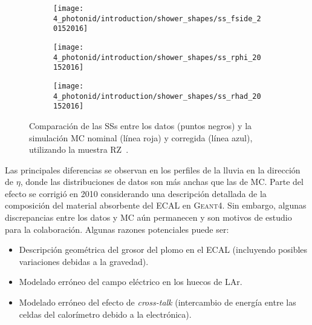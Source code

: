 \begin{figure}[ht!]
    \centering
    \begin{subfigure}[h]{0.32\linewidth}
        \centering
        \texttt{[image: 4\_photonid/introduction/shower\_shapes/ss\_fside\_20152016]}
        \caption{\fside}
        \label{fig:pid_ss:ss_differences:ss:fside}
    \end{subfigure}
    \hfill
    \begin{subfigure}[h]{0.32\linewidth}
        \centering
        \texttt{[image: 4\_photonid/introduction/shower\_shapes/ss\_rphi\_20152016]}
        \caption{\rphi}
        \label{fig:pid_ss:ss_differences:ss:rphi}
    \end{subfigure}
    \hfill
    \begin{subfigure}[h]{0.32\linewidth}
        \centering
        \texttt{[image: 4\_photonid/introduction/shower\_shapes/ss\_rhad\_20152016]}
        \caption{\rhad}
        \label{fig:pid_ss:ss_differences:ss:rhad}
    \end{subfigure}
    \caption{Comparaci\'on de las \acp{SS} entre los datos (puntos negros) y la simulación \ac{MC} nominal (línea roja) y corregida (línea azul), utilizando la muestra \ac{RZ}~\cite{ATLAS-EGamma-Calibration-2015-2016}.}
    \label{fig:pid_ss:ss_differences:ss}
\end{figure}

Las principales diferencias se observan en los perfiles de la lluvia en la direcci\'on de \(\eta\), donde las distribuciones de datos son m\'as anchas que las de \ac{MC}. Parte del efecto se corrigió en 2010 considerando una descripci\'on detallada de la composición del material absorbente del \ac{ECAL} en \textsc{Geant4}. Sin embargo, algunas discrepancias entre los datos y \ac{MC} aún permanecen y son motivos de estudio para la colaboraci\'on. Algunas razones potenciales puede ser:
\begin{itemize}
    \item Descripción geom\'etrica del grosor del plomo en el \ac{ECAL} (incluyendo posibles variaciones debidas a la gravedad).
    \item Modelado erróneo del campo eléctrico en los huecos de \ac{LAr}.
    \item Modelado erróneo del efecto de \textit{cross-talk} (intercambio de energía entre las celdas del calorímetro debido a la electrónica).
\end{itemize}


